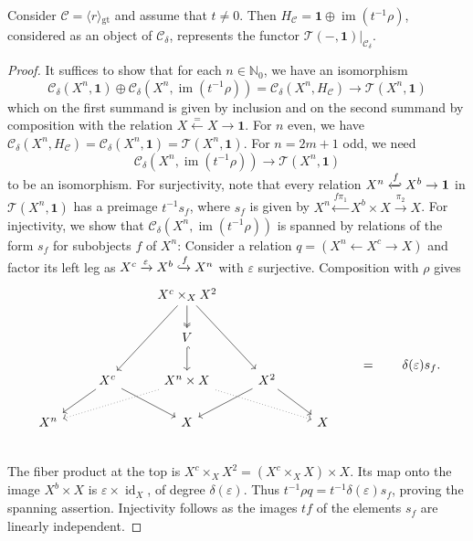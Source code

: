 \documentclass[11pt]{amsart}
\theoremstyle{definition}
\theoremstyle{remark}
\newcommand\cC{\mathcal C}
\newcommand\cT{\mathcal T}
\newcommand\id{\operatorname{id}}
\newcommand\im{\operatorname{im}}
\renewcommand\:\colon
\newcommand\one{\mathbf{1}}
\newcommand\NN{\mathbb N}
\renewcommand\:\colon
\newcommand\eps{\varepsilon}
\newcommand\angl[1]{\langle{}#1\rangle{}} %
\newcommand\gtcategory[1]{\angl{#1}_{\mathrm{gt}}}
\begin{document}
\begin{proposition} \label{p:r-has-adjoint}
    Consider $\cC = \gtcategory{r}$ and assume that $t \ne 0$. Then $H_\cC = \one \oplus \im(t^{-1}\rho)$, considered as an object of $\cC_\delta$, represents the functor $\cT(-, \one)|_{\cC_\delta}$.
\end{proposition}
\begin{proof}
    It suffices to show that for each $n \in \NN_0$, we have an isomorphism
    \[
        \cC_\delta(X^n, \one) \oplus \cC_\delta(X^n, \im(t^{-1}\rho)) = \cC_\delta(X^n, H_\cC) \longrightarrow \cT(X^n, \one)
    \]
    which on the first summand is given by inclusion and on the second summand by composition with the relation $X \xleftarrow{=} X \to \one$. For $n$ even, we have $\cC_\delta(X^n, H_\cC) = \cC_\delta(X^n, \one) = \cT(X^n, \one)$. For $n = 2m+1$ odd, we need
    \[
        \cC_\delta(X^n, \im(t^{-1}\rho)) \longrightarrow \cT(X^n, \one)
    \]
    to be an isomorphism. For surjectivity, note that every relation $X^n \xhookleftarrow{f} X^b \to \one$ in $\cT(X^n, \one)$ has a preimage $t^{-1} s_f$, where $s_f$ is given by $X^n \xleftarrow{f\pi_1} X^b \times X \xrightarrow{\pi_2} X$.
    For injectivity, we show that $\cC_\delta(X^n, \im(t^{-1}\rho))$ is spanned by relations of the form $s_f$ for subobjects $f$ of $X^n$: Consider a relation $q=(X^n \leftarrow X^c \to X)$ and factor its left leg as $X^c\xrightarrow{\eps}X^b\xhookrightarrow{f}X^n$ with $\eps$ surjective. Composition with $\rho$ gives
    \[\begin{tikzcd}
        && X^c \times_{X} X^2 \arrow{ldd} \arrow{rdd} \arrow[two heads]{d} && \\
        && V \arrow[hook]{d} && \\
        & X^c \arrow{ld} \arrow[pos=.7,swap]{rd} & X^n \times X \arrow[dotted]{lld}\arrow[dotted]{rrd} & X^2 \arrow[pos=.7]{ld} \arrow{rd} & \\
        X^n && X && X \\
    \end{tikzcd} \qquad = \qquad \delta(\eps)s_f.
    \]
    The fiber product at the top is $X^c \times_X X^2 = (X^c \times_X X) \times X$. Its map onto the image $X^b\times X$ is $\eps\times\id_X$, of degree $\delta(\eps)$. Thus $t^{-1}\rho q=t^{-1}\delta(\eps)s_f$, proving the spanning assertion. Injectivity follows as the images $tf$ of the elements $s_f$ are linearly independent.
\end{proof}
\end{document}
